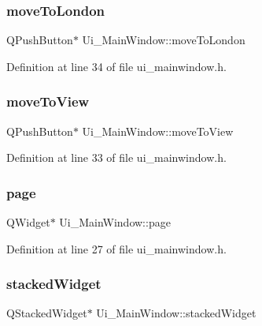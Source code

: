 \subsubsection{\texorpdfstring{moveToLondon}{moveToLondon}}
{\footnotesize\ttfamily Q\+Push\+Button$\ast$ Ui\+\_\+\+Main\+Window\+::move\+To\+London}



Definition at line 34 of file ui\+\_\+mainwindow.\+h.

\mbox{\label{class_ui___main_window_ad9801547cfce7c5d19b427123105f0b2}} 
\subsubsection{\texorpdfstring{moveToView}{moveToView}}
{\footnotesize\ttfamily Q\+Push\+Button$\ast$ Ui\+\_\+\+Main\+Window\+::move\+To\+View}



Definition at line 33 of file ui\+\_\+mainwindow.\+h.

\mbox{\label{class_ui___main_window_ad7d164376bef8649ee1f94697b859417}} 
\subsubsection{\texorpdfstring{page}{page}}
{\footnotesize\ttfamily Q\+Widget$\ast$ Ui\+\_\+\+Main\+Window\+::page}



Definition at line 27 of file ui\+\_\+mainwindow.\+h.

\mbox{\label{class_ui___main_window_a8d440a6df1de0bc57afcdda7476d8f19}} 
\subsubsection{\texorpdfstring{stackedWidget}{stackedWidget}}
{\footnotesize\ttfamily Q\+Stacked\+Widget$\ast$ Ui\+\_\+\+Main\+Window\+::stacked\+Widget}



